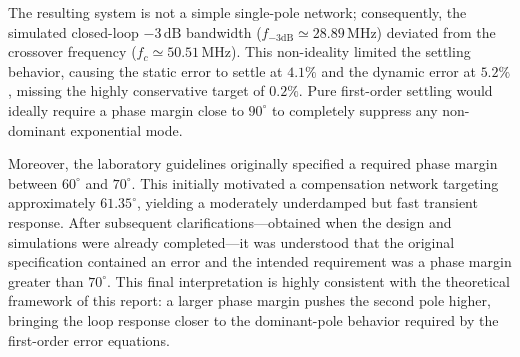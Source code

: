 The resulting system is not a simple single-pole network; consequently, the simulated closed-loop $-3\,\mathrm{dB}$ bandwidth ($f_{-3\mathrm{dB}}\simeq28.89\,\mathrm{MHz}$) deviated from the crossover frequency ($f_c\simeq50.51\,\mathrm{MHz}$). This non-ideality limited the settling behavior, causing the static error to settle at $4.1\%$ and the dynamic error at $5.2\%$, missing the highly conservative target of $0.2\%$. Pure first-order settling would ideally require a phase margin close to $90^\circ$ to completely suppress any non-dominant exponential mode. 


Moreover, the laboratory guidelines originally specified a required phase margin between $60^\circ$ and $70^\circ$. This initially motivated a compensation network targeting approximately $61.35^\circ$, yielding a moderately underdamped but fast transient response. After subsequent clarifications—obtained when the design and simulations were already completed—it was understood that the original specification contained an error and the intended requirement was a phase margin greater than $70^\circ$. This final interpretation is highly consistent with the theoretical framework of this report: a larger phase margin pushes the second pole higher, bringing the loop response closer to the dominant-pole behavior required by the first-order error equations.
